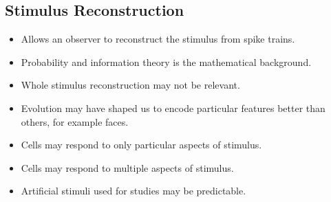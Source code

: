 \documentclass[main]{subfiles}
\begin{document}
\subsection{Stimulus Reconstruction}
\begin{itemize}[noitemsep,nolistsep]
	\item Allows an observer to reconstruct the stimulus from spike trains.
	\item Probability and information theory is the mathematical background.
	\item Whole stimulus reconstruction may not be relevant.
	\item Evolution may have shaped us to encode particular features better than others, for example faces.
	\item Cells may respond to only particular aspects of stimulus.
	\item Cells may respond to multiple aspects of stimulus.
	\item Artificial stimuli used for studies may be predictable.
\end{itemize}
\end{document}
